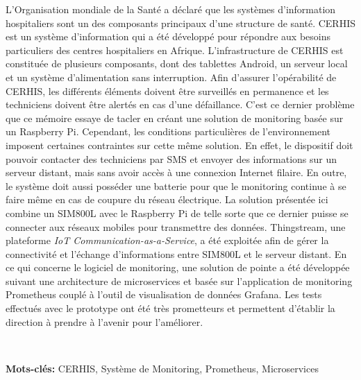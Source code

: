 \documentclass[a4paper, 12pt]{report}
\begin{document}
  \noindent
   L’Organisation mondiale de la Santé a déclaré que les systèmes d’information hospitaliers sont un des composants principaux d’une structure de santé. CERHIS est un système d’information qui a été développé pour répondre aux besoins particuliers des centres hospitaliers en Afrique. L’infrastructure de CERHIS est constituée de plusieurs composants, dont des tablettes Android, un serveur local et un système d’alimentation sans interruption. Afin d’assurer l’opérabilité de CERHIS, les différents éléments doivent être surveillés en permanence et les techniciens doivent être alertés en cas d’une défaillance. C’est ce dernier problème que ce mémoire essaye de tacler en créant une solution de monitoring basée sur un Raspberry Pi. Cependant, les conditions particulières de l’environnement imposent certaines contraintes sur cette même solution. En effet, le dispositif doit pouvoir contacter des techniciens par SMS et envoyer des informations sur un serveur distant, mais sans avoir accès à une connexion Internet filaire. En outre, le système doit aussi posséder une batterie pour que le monitoring continue à se faire même en cas de coupure du réseau électrique. La solution présentée ici combine un SIM800L avec le Raspberry Pi de telle sorte que ce dernier puisse se connecter aux réseaux mobiles pour transmettre des données. Thingstream, une plateforme \textit{IoT Communication-as-a-Service}, a été exploitée afin de gérer la connectivité et l'échange d'informations entre SIM800L et le serveur distant. En ce qui concerne le logiciel de monitoring, une solution de pointe a été développée suivant une architecture de microservices et basée sur l'application de monitoring Prometheus couplé à l’outil de visualisation de données Grafana. Les tests effectués avec le prototype ont été très prometteurs et permettent d’établir la direction à prendre à l'avenir pour l'améliorer.

   ~

   \noindent
   \textbf{Mots-clés:} CERHIS, \hspace{0.2cm} Système de Monitoring, \hspace{0.2cm} Prometheus, \hspace{0.2cm} Microservices





\tableofcontents
\newpage










\end{document}
